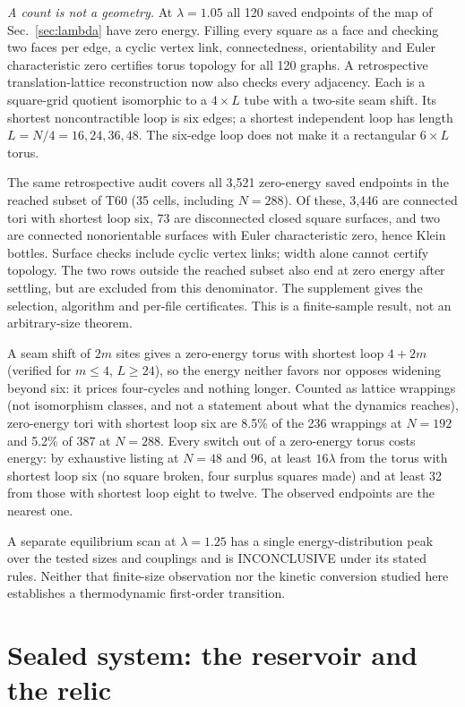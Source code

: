 \documentclass[aps,pre,10pt,twocolumn,superscriptaddress,nofootinbib]{revtex4-2}
\begin{document}
\emph{A count is not a geometry.} At $\lambda=1.05$ all 120 saved endpoints of the map of
Sec.~\ref{sec:lambda} have zero energy. Filling every square as a face and checking two faces per
edge, a cyclic vertex link, connectedness, orientability and Euler characteristic zero certifies
torus topology for all 120 graphs. A retrospective translation-lattice reconstruction now also
checks every adjacency. Each is a square-grid quotient isomorphic to a $4\times L$ tube with a
two-site seam shift. Its shortest noncontractible loop is six edges; a shortest independent loop
has length $L=N/4=16,24,36,48$. The six-edge loop does not make it a rectangular $6\times L$ torus.

The same retrospective audit covers all 3,521 zero-energy saved endpoints in the reached subset
of T60 (35 cells, including $N=288$). Of these, 3,446 are connected tori with shortest loop six,
73 are disconnected closed square surfaces, and two are connected nonorientable surfaces with
Euler characteristic zero, hence Klein bottles. Surface checks include cyclic vertex links;
width alone cannot certify topology. The two rows outside the reached subset also end at zero
energy after settling, but are excluded from this denominator. The supplement gives the selection,
algorithm and per-file certificates. This is a finite-sample result, not an arbitrary-size theorem.

A seam shift of $2m$ sites gives a zero-energy torus with shortest loop $4+2m$ (verified for
$m\le4$, $L\ge24$), so the energy neither favors nor opposes widening beyond six: it prices
four-cycles and nothing longer. Counted as lattice wrappings (not isomorphism classes, and not a
statement about what the dynamics reaches), zero-energy tori with shortest loop six are 8.5\% of the
236 wrappings at $N=192$ and 5.2\% of 387 at $N=288$. Every switch out of a zero-energy torus costs
energy: by exhaustive listing at $N=48$ and 96, at least $16\lambda$ from the torus with shortest loop six
(no square broken, four surplus squares made) and at least 32 from those with shortest loop eight to
twelve. The observed endpoints are the nearest one.

A separate equilibrium scan at $\lambda=1.25$ has a single energy-distribution peak over the tested
sizes and couplings and is INCONCLUSIVE under its stated rules. Neither that finite-size observation
nor the kinetic conversion studied here establishes a thermodynamic first-order transition.

\section{Sealed system: the reservoir and the relic}
\label{sec:sealed}
\end{document}
